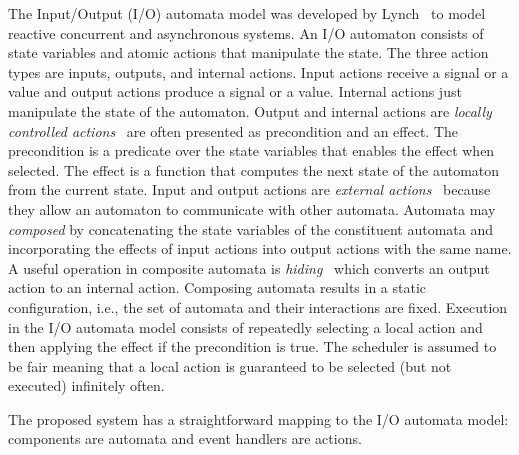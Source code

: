 The Input/Output (I/O) automata model was developed by Lynch~\cite{lynch1996distributed} to model reactive concurrent and asynchronous systems.
An I/O automaton consists of state variables and atomic actions that manipulate the state.
The three action types are inputs, outputs, and internal actions.
Input actions receive a signal or a value and output actions produce a signal or a value.
Internal actions just manipulate the state of the automaton.
Output and internal actions are \emph{locally controlled actions}~\cite{lynch1996distributed} are often presented as precondition and an effect.
The precondition is a predicate over the state variables that enables the effect when selected.
The effect is a function that computes the next state of the automaton from the current state.
Input and output actions are \emph{external actions}~\cite{lynch1996distributed} because they allow an automaton to communicate with other automata.
Automata may \emph{composed} by concatenating the state variables of the constituent automata and incorporating the effects of input actions into output actions with the same name.
A useful operation in composite automata is \emph{hiding}~\cite{lynch1996distributed} which converts an output action to an internal action.
Composing automata results in a static configuration, i.e., the set of automata and their interactions are fixed.
Execution in the I/O automata model consists of repeatedly selecting a local action and then applying the effect if the precondition is true.
The scheduler is assumed to be fair meaning that a local action is guaranteed to be selected (but not executed) infinitely often.

The proposed system has a straightforward mapping to the I/O automata model: components are automata and event handlers are actions.
